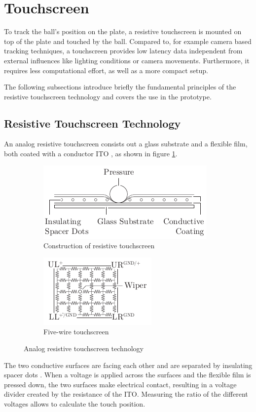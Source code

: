 \section{Touchscreen}
To track the ball's position on the plate, a resistive touchscreen is mounted
on top of the plate and touched by the ball. Compared to, for example camera
based tracking techniques, a touchscreen provides low latency data independent
from external influences like lighting conditions or camera movements.
Furthermore, it requires less computational effort, as well as a more compact
setup.

The following subsections introduce briefly the fundamental principles of the
resistive touchscreen technology and covers the use in the prototype.

\subsection{Resistive Touchscreen Technology}
An analog resistive touchscreen consists out a glass substrate and a flexible
film, both coated with a conductor \ac{ITO} \citep{Wal12}, as shown in figure
\ref{fig:touch_build}.
\begin{figure}
	\centering
	\begin{subfigure}{0.49\textwidth}
		\centering
		\includegraphics{../figures/touch_build}
		\caption{Construction of resistive touchscreen}
		\label{fig:touch_build}
	\end{subfigure}
	\begin{subfigure}{0.49\textwidth}
		\centering
		\includegraphics{../figures/touch_five}
		\caption{Five-wire touchscreen}
		\label{fig:touch_five}
	\end{subfigure}
	\caption{Analog resistive touchscreen technology}
	\label{fig:touch}
\end{figure}
The two conductive surfaces are facing each other and
are separated by insulating spacer dots \citep{Wal12}. When a voltage is
applied across the surfaces and the flexible film is pressed down, the two
surfaces make electrical contact, resulting in a voltage divider created by
the resistance of the \ac{ITO}. Measuring the ratio of the different voltages
allows to calculate the touch position.

